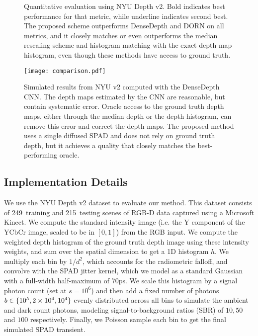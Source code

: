 \begin{figure*}[!t]
\begin{center}

\caption{Quantitative evaluation using NYU Depth v2. Bold indicates best performance for that metric, while underline indicates second best. The proposed scheme outperforms DenseDepth and DORN on all metrics, and it closely matches or even outperforms the median rescaling scheme and histogram matching with the exact depth map histogram, even though these methods have access to ground truth. }
\end{center}
\end{figure*}

\begin{figure*}[!t]
  \texttt{[image: comparison.pdf]}
  \caption{Simulated results from NYU v2 computed with the DenseDepth CNN. The depth maps estimated by the CNN are reasonable, but contain systematic error. Oracle access to the ground truth depth maps, either through the median depth or the depth histogram, can remove this error and correct the depth maps. The proposed method uses a single diffused SPAD and does not rely on ground truth depth, but it achieves a quality that closely matches the best-performing oracle.}
	\label{fig:results_simulated}
\end{figure*}


\subsection{Implementation Details}

We use the NYU Depth v2 dataset to evaluate our method. This dataset consists of
249~training and 215~testing scenes of RGB-D data captured using a Microsoft
Kinect.
We compute the standard intensity image (i.e. the Y
component of the YCbCr image, scaled to be in $[0,1]$) from the RGB input. We compute the weighted depth
histogram of the ground truth depth image using these intensity weights, and sum
over the spatial dimension to get a 1D histogram $h$. We multiply each bin by
$1/d^2$, which accounts for the radiometric falloff, and convolve with the SPAD
jitter kernel, which we model as a standard Gaussian with a full-width
half-maximum of 70ps. We scale this histogram by a signal photon count (set at
$s = 10^6$) and then add a fixed number of photons $b \in \{10^5, 2\times 10^4, 10^4\}$ evenly distributed across all
bins to simulate the ambient and dark count photons, modeling
signal-to-background ratios (SBR) of $10, 50$ and $100$ respectively. Finally,
we Poisson sample each bin to get the final simulated SPAD transient.

